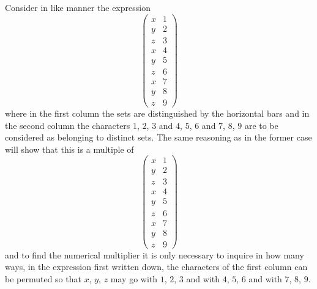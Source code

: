 \documentclass[11pt,a4paper]{article}
\theoremstyle{plain}
\begin{document}
Consider in like manner the expression
\[\begin{pmatrix} x & 1 \\ y & 2 \\ z & 3 \\ \hline x & 4 \\ y & 5 \\ z & 6 \\ \hline x & 7 \\ y & 8 \\ z & 9 \end{pmatrix}\]
where in the first column the sets are distinguished by the horizontal bars and in the second column the characters $1$, $2$, $3$ and $4$, $5$, $6$ and $7$, $8$, $9$ are to be considered as belonging to distinct sets. The same reasoning as in the former case will show that this is a multiple of
\[\begin{pmatrix} x & 1 \\ y & 2 \\ z & 3 \\ \hline x & 4 \\ y & 5 \\ z & 6 \\ \hline x & 7 \\ y & 8 \\ z & 9 \end{pmatrix}\]
and to find the numerical multiplier it is only necessary to inquire in how many ways, in the expression first written down, the characters of the first column can be permuted so that $x$, $y$, $z$ may go with $1$, $2$, $3$ and with $4$, $5$, $6$ and with $7$, $8$, $9$.
\end{document}
